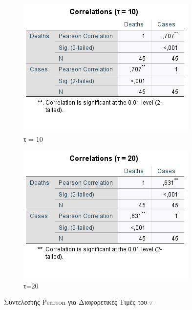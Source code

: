 \documentclass{article}
\begin{document}
\begin{figure}
    \centering
    \begin{subfigure}[b]{0.8\textwidth}
        \centering
        \includegraphics[width=\textwidth]{media/2/pearson_t10.png}
        \caption{τ = 10}     
    \end{subfigure} 
    \hfill
    \begin{subfigure}[b]{0.8\textwidth}  
        \centering 
        \includegraphics[width=\textwidth]{media/2/pearson_t20.png}
        \caption{τ=20}    
    \end{subfigure}
    \caption{Συντελεστής \foreignlanguage{english}{Pearson} για Διαφορετικές Τιμές του $ \tau $} 
    \label{pearson_t_10_20}
\end{figure}
\end{document}
